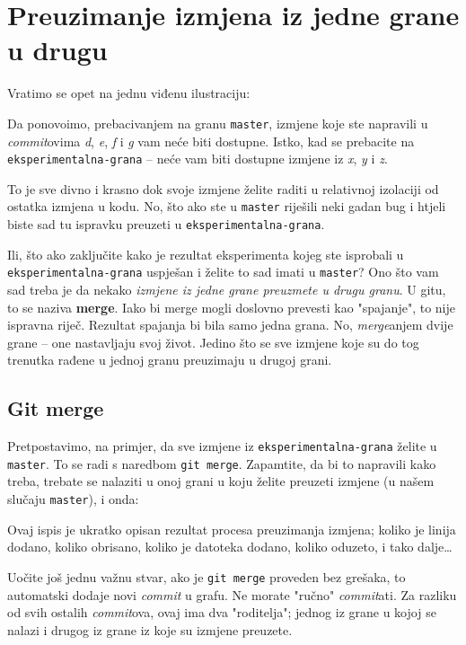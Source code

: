 \chapter*{Preuzimanje izmjena iz jedne grane u drugu}

Vratimo se opet na jednu viđenu ilustraciju:



Da ponovoimo, prebacivanjem na granu \verb+master+, izmjene koje ste napravili u \emph{commit}ovima \emph d, \emph e, \emph f i \emph g vam neće biti dostupne.
Istko, kad se prebacite na \verb+eksperimentalna-grana+ -- neće vam biti dostupne izmjene iz \emph x, \emph y i \emph z.

To je sve divno i krasno dok svoje izmjene želite raditi u relativnoj izolaciji od ostatka izmjena u kodu. 
No, što ako ste u \verb+master+ riješili neki gadan bug i htjeli biste sad tu ispravku preuzeti u \verb+eksperimentalna-grana+.

Ili, što ako zaključite kako je rezultat eksperimenta kojeg ste isprobali u \verb+eksperimentalna-grana+ uspješan i želite to sad imati u \verb+master+?
Ono što vam sad treba je da nekako \emph{izmjene iz jedne grane preuzmete u drugu granu}.
U gitu, to se naziva \textbf{merge}.
Iako bi merge mogli doslovno prevesti kao "spajanje", to nije ispravna riječ. 
Rezultat spajanja bi bila samo jedna grana. 
No, \emph{merge}anjem dvije grane -- one nastavljaju svoj život. 
Jedino što se sve izmjene koje su do tog trenutka rađene u jednoj granu preuzimaju u drugoj grani.

\section*{Git merge}

Pretpostavimo, na primjer, da sve izmjene iz \verb+eksperimentalna-grana+ želite u \verb+master+. 
To se radi s naredbom \verb+git merge+.
Zapamtite, da bi to napravili kako treba, trebate se nalaziti u onoj grani u koju želite preuzeti izmjene (u našem slučaju \verb+master+), i onda:



Ovaj ispis je ukratko opisan rezultat procesa preuzimanja izmjena; koliko je linija dodano, koliko obrisano, koliko je datoteka dodano, koliko oduzeto, i tako dalje\dots

Uočite još jednu važnu stvar, ako je \verb+git merge+ proveden bez grešaka, to automatski dodaje novi \emph{commit} u grafu. 
Ne morate "ručno" \emph{commit}ati.
Za razliku od svih ostalih \emph{commit}ova, ovaj ima dva "roditelja"; jednog iz grane u kojoj se nalazi i drugog iz grane iz koje su izmjene preuzete.

